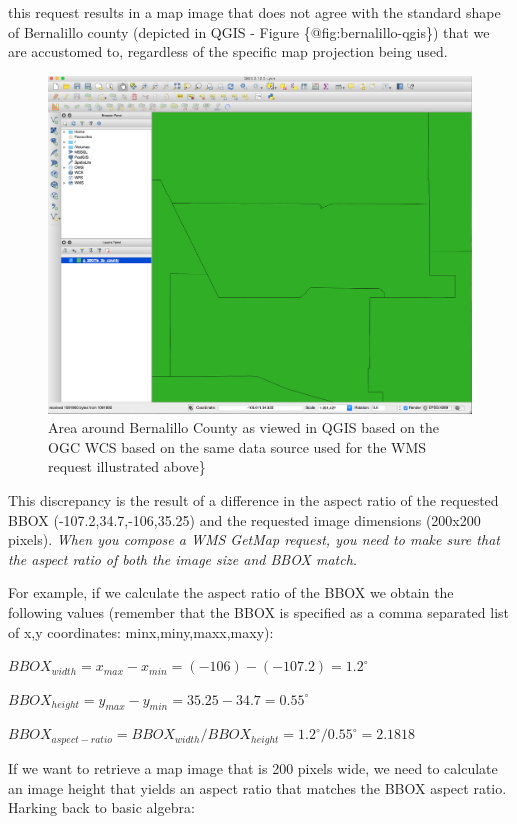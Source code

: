 \documentclass[]{book}
\begin{document}
this request results in a map image that does not agree with the
standard shape of Bernalillo county (depicted in QGIS - Figure
\{@fig:bernalillo-qgis\}) that we are accustomed to, regardless of the
specific map projection being used.

\begin{figure}[htbp]
\centering
\includegraphics{images/bernalillo_qgis.png}
\caption{Area around Bernalillo County as viewed in QGIS based on the
OGC WCS based on the same data source used for the WMS request
illustrated above\}}
\end{figure}

This discrepancy is the result of a difference in the aspect ratio of
the requested BBOX (-107.2,34.7,-106,35.25) and the requested image
dimensions (200x200 pixels). \emph{When you compose a WMS GetMap
request, you need to make sure that the aspect ratio of both the image
size and BBOX match.}

For example, if we calculate the aspect ratio of the BBOX we obtain the
following values (remember that the BBOX is specified as a comma
separated list of x,y coordinates: minx,miny,maxx,maxy):

\(BBOX_{width} = x_{max} - x_{min} = (-106) - (-107.2) = 1.2^{\circ}\)

\(BBOX_{height} = y_{max} - y_{min} = 35.25 - 34.7 = 0.55^{\circ}\)

\(BBOX_{aspect-ratio} = BBOX_{width} / BBOX_{height} = 1.2^{\circ} / 0.55^{\circ} = 2.1818\)

If we want to retrieve a map image that is 200 pixels wide, we need to
calculate an image height that yields an aspect ratio that matches the
BBOX aspect ratio. Harking back to basic algebra:
\end{document}
